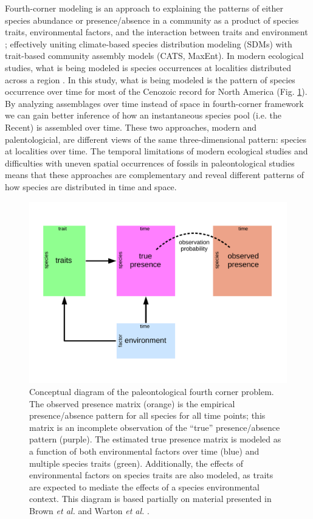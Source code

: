 Fourth-corner modeling is an approach to explaining the patterns of either species abundance or presence/absence in a community as a product of species traits, environmental factors, and the interaction between traits and environment \citep{Brown2014c,Warton2015a,Pollock2012,Jamil2013}; effectively uniting climate-based species distribution modeling (SDMs) with trait-based community assembly models (CATS, MaxEnt). In modern ecological studies, what is being modeled is species occurrences at localities distributed across a region \citep{Pollock2012,Jamil2013}. In this study, what is being modeled is the pattern of species occurrence over time for most of the Cenozoic record for North America (Fig. \ref{fig:concept_fourth_corner}). By analyzing assemblages over time instead of space in fourth-corner framework we can gain better inference of how an instantaneous species pool (i.e. the Recent) is assembled over time. These two approaches, modern and palentologicial, are different views of the same three-dimensional pattern: species at localities over time. The temporal limitations of modern ecological studies and difficulties with uneven spatial occurrences of fossils in paleontological studies means that these approaches are complementary and reveal different patterns of how species are distributed in time and space.

\begin{figure}[ht]
  \centering
  \includegraphics[width=\textwidth,height=0.4\textheight,keepaspectratio=true]{chapter_coping/figure/paleo_fourth_corner}
  \caption[Conceptual diagram of the paleontological fourth-courner problem]{Conceptual diagram of the paleontological fourth corner problem. The observed presence matrix (orange) is the empirical presence/absence pattern for all species for all time points; this matrix is an incomplete observation of the ``true'' presence/absence pattern (purple). The estimated true presence matrix is modeled as a function of both environmental factors over time (blue) and multiple species traits (green). Additionally, the effects of environmental factors on species traits are also modeled, as traits are expected to mediate the effects of a species environmental context. This diagram is based partially on material presented in Brown \textit{et al.} \citep{Brown2014c} and Warton \textit{et al.} \citep{Warton2015a}.}
  \label{fig:concept_fourth_corner}
\end{figure}

